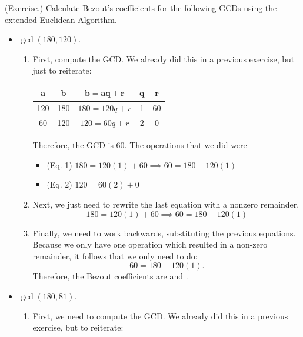 \documentclass[letterpaper]{article}
\newcommand{\0}{\mathbf{0}}
\begin{document}
\begin{mdframed}
    (Exercise.) Calculate Bezout's coefficients for the following GCDs using the extended Euclidean Algorithm.
    \begin{itemize}
        \item $\gcd(180, 120).$
        \begin{mdframed}
            \begin{enumerate}
                \item First, compute the GCD. We already did this in a previous exercise, but just to reiterate: 
                \begin{center}
                    \begin{tabular}{|c|c|c|c|c|}
                        \hline 
                        $\mathbf{a}$ & $\mathbf{b}$ & $\mathbf{b = aq + r}$ & $\mathbf{q}$ & $\mathbf{r}$ \\ 
                        \hline 
                        120 & 180 & $180 = 120q + r$ & 1   & 60 \\ 
                        60  & 120 & $120 = 60q + r$  & 2   & 0  \\ 
                        \hline 
                    \end{tabular}
                \end{center}
                Therefore, the GCD is 60. The operations that we did were 
                \begin{itemize}
                    \item (Eq. 1) $180 = 120(1) + 60 \implies 60 = 180 - 120(1)$
                    \item (Eq. 2) $120 = 60(2) + 0$
                \end{itemize}


                \item Next, we just need to rewrite the last equation with a nonzero remainder. 
                \[180 = 120(1) + 60 \implies 60 = 180 - 120(1)\]

                \item Finally, we need to work backwards, substituting the previous equations. Because we only have one operation which resulted in a non-zero remainder, it follows that we only need to do: 
                \[60 = 180 - 120(1).\]
                Therefore, the Bezout coefficients are  and .
            \end{enumerate}
        \end{mdframed}
        \item $\gcd(180, 81).$
        \begin{mdframed}
            \begin{enumerate}
                \item First, we need to compute the GCD. We already did this in a previous exercise, but to reiterate: 
                

\end{enumerate}
\end{mdframed}
\end{itemize}
\end{mdframed}
\end{document}
